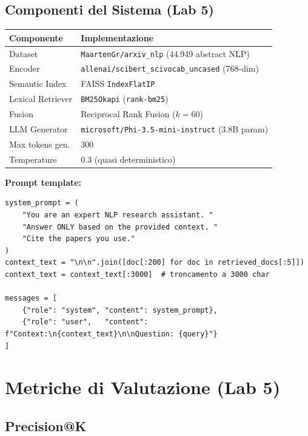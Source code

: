\documentclass[12pt,a4paper]{article}
\begin{document}
\subsection{Componenti del Sistema (Lab 5)}

\begin{center}
\begin{tabular}{ll}
\toprule
\textbf{Componente} & \textbf{Implementazione} \\
\midrule
Dataset & \texttt{MaartenGr/arxiv\_nlp} (44.949 abstract NLP) \\
Encoder & \texttt{allenai/scibert\_scivocab\_uncased} (768-dim) \\
Semantic Index & FAISS \texttt{IndexFlatIP} \\
Lexical Retriever & \texttt{BM25Okapi} (\texttt{rank-bm25}) \\
Fusion & Reciprocal Rank Fusion ($k=60$) \\
LLM Generator & \texttt{microsoft/Phi-3.5-mini-instruct} (3.8B param) \\
Max tokens gen. & 300 \\
Temperature & 0.3 (quasi deterministico) \\
\bottomrule
\end{tabular}
\end{center}

\textbf{Prompt template:}
\begin{codebox}
\begin{lstlisting}[style=python]
system_prompt = (
    "You are an expert NLP research assistant. "
    "Answer ONLY based on the provided context. "
    "Cite the papers you use."
)
context_text = "\n\n".join([doc[:200] for doc in retrieved_docs[:5]])
context_text = context_text[:3000]  # troncamento a 3000 char

messages = [
    {"role": "system", "content": system_prompt},
    {"role": "user",   "content": f"Context:\n{context_text}\n\nQuestion: {query}"}
]
\end{lstlisting}
\end{codebox}

\section{Metriche di Valutazione (Lab 5)}

\subsection{Precision@K}
\end{document}
